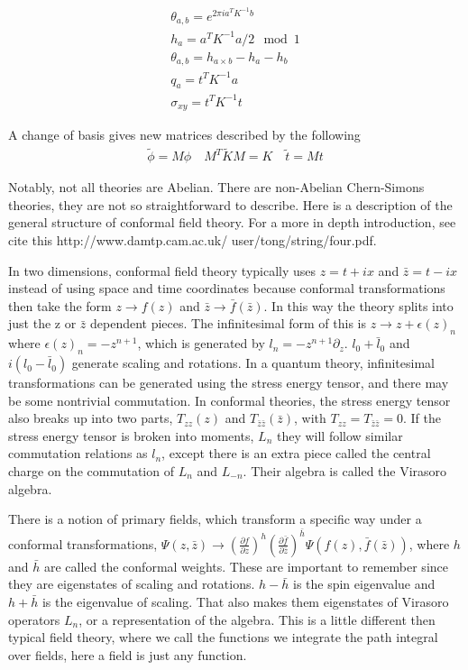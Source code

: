 \begin{align}
\theta_{a,b} = e^{2\pi i a^T K^{-1} b} \label{eq:transform1}\\
h_a = a^T K^{-1} a /2 \mod 1 \label{eq:transform2}\\
\theta_{a,b}= h_{a\times b}-h_a-h_b  \label{eq:transform3}\\
q_a = t^TK^{-1}a \label{eq:transform4}\\
\sigma_{xy} = t^TK^{-1}t \label{eq:transform5}
\end{align}

A change of basis gives new matrices described by the following 
\begin{align}
\tilde{\phi}=M\phi \quad M^T\tilde{K}M=K \quad \tilde{t}=Mt
\end{align}

Notably, not all theories are Abelian. There are non-Abelian Chern-Simons theories, they are not so straightforward to describe. Here is a description of the general structure of conformal field theory.  For a more in depth introduction, see {\color{red}cite this} http://www.damtp.cam.ac.uk/ user/tong/string/four.pdf. 

In two dimensions, conformal field theory typically uses $z = t + ix$  and $\bar{z}= t - ix$ instead of using space and time coordinates because conformal transformations then take the form $z \rightarrow f(z)$ and $\bar{z} \rightarrow \bar{f}(\bar{z})$. In this way the theory splits into just the z or $\bar{z}$ dependent pieces. The infinitesimal form of this is $z \rightarrow z + \epsilon(z)_n$ where $\epsilon(z)_n = -z^{n+1}$, which is generated by $l_n = -z^{n+1}\partial_z$. $l_0+\bar{l}_0$ and $i(l_0-\bar{l}_0)$ generate scaling and rotations. In a quantum theory, infinitesimal transformations can be generated using the stress energy tensor, and there may be some nontrivial commutation. In conformal theories, the stress energy tensor also breaks up into two parts, $T_{zz}(z)$ and $T_{\bar{z}\bar{z}}(\bar{z})$, with $T_{zz} =T_{\bar{z}\bar{z}}=0$. If the stress energy tensor is broken into moments, $L_n$ they will follow similar commutation relations as $l_n$, except there is an extra piece called the central charge on the commutation of $L_n$ and $L_{-n}$. Their algebra is called the Virasoro algebra.

There is a notion of primary fields, which transform a specific way under a conformal transformations, $ \Psi(z,\bar{z}) \rightarrow (\frac{\partial f}{\partial z})^h (\frac{\partial \bar{f}}{\partial \bar{z}})^{\bar{h}}  \Psi(f(z),\bar{f}(\bar{z}))$, where $h$ and $\bar{h}$ are called the conformal weights. These are important to remember since they are eigenstates of scaling and rotations. $h-\bar{h}$ is the spin eigenvalue and $h+\bar{h}$ is the eigenvalue of scaling. That also makes them eigenstates of Virasoro operators $L_n$, or a representation of the algebra. This is a little different then typical field theory, where we call the functions we integrate the path integral over fields, here a field is just any function.

